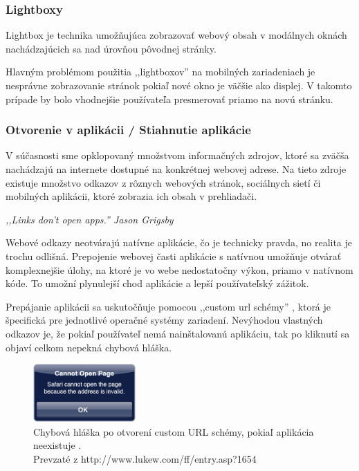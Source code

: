 

\subsubsection{Lightboxy} %
\label{subsub:lightboxy}

Lightbox je technika umožňujúca zobrazovať webový obsah v modálnych oknách nachádzajúcich sa nad úrovňou pôvodnej stránky.

Hlavným problémom použitia ,,lightboxov'' na mobilných zariadeniach je nesprávne zobrazovanie stránok pokiaľ nové okno je väčšie ako displej. V takomto prípade by bolo vhodnejšie používateľa presmerovať priamo na novú stránku.


\subsubsection{Otvorenie v aplikácii / Stiahnutie aplikácie} %
\label{ssub:otvorenie_v_aplik_cii}

V súčasnosti sme opklopovaný množstvom informačných zdrojov, ktoré sa zväčša nachádzajú na internete dostupné na konkrétnej webovej adrese. Na tieto zdroje existuje množstvo odkazov z rôznych webových stránok, sociálnych sietí či mobilných aplikácii, ktoré zobrazia ich obsah v prehliadači.

\begin{fancybox}
\textit{,,Links don’t open apps.'' Jason Grigsby} \cite{links}
\end{fancybox}

Webové odkazy neotvárajú natívne aplikácie, čo je technicky pravda, no realita je trochu odlišná. Prepojenie webovej časti aplikácie s natívnou umožňuje otvárať komplexnejšie úlohy, na ktoré je vo webe nedostatočny výkon, priamo v natívnom kóde. To umožní plynulejší chod aplikácie a lepší používateľský zážitok.

Prepájanie aplikácii sa uskutočňuje pomocou ,,custom url schémy'' \cite{urlscheme}, ktorá je špecifická pre jednotlivé operačné systémy zariadení. Nevýhodou vlastných odkazov je, že pokiaľ používateľ nemá nainštalovanú aplikáciu, tak po kliknutí sa objaví celkom nepekná chybová hláška.

\begin{figure}[H]
	\centering
	\includegraphics[width=0.35\textwidth]{img/customerror.png}
	\caption[Chybová hláška po otvorení custom URL schémy, pokiaľ aplikácia neexistuje]{
		Chybová hláška po otvorení custom URL schémy, pokiaľ aplikácia neexistuje \cite{customscheme}.\\
		Prevzaté z http://www.lukew.com/ff/entry.asp?1654}
	\label{fig: customerror}
\end{figure}

